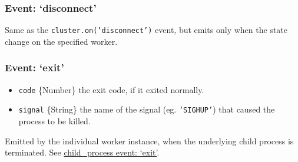 \subsubsection{Event: `disconnect'}

Same as the \texttt{cluster.on('disconnect')} event, but emits only when
the state change on the specified worker.

\begin{Shaded}
\begin{Highlighting}[]
\NormalTok{(}\NormalTok{, }\NormalTok{() \{}
\NormalTok{\};}
\end{Highlighting}
\end{Shaded}

\subsubsection{Event: `exit'}

\begin{itemize}
\item
  \texttt{code} \{Number\} the exit code, if it exited normally.
\item
  \texttt{signal} \{String\} the name of the signal (eg.
  \texttt{'SIGHUP'}) that caused the process to be killed.
\end{itemize}

Emitted by the individual worker instance, when the underlying child
process is terminated. See
\href{child\_process.html\#child\_process\_event\_exit}{child\_process
event: `exit'}.

\begin{Shaded}
\begin{Highlighting}[]
 \NormalTok{();}
\NormalTok{(}\NormalTok{, }
    \NormalTok{(}
  \NormalTok{\} }  \NormalTok{) \{}
    \NormalTok{(}
  \NormalTok{\} } \NormalTok{\{}
    \NormalTok{(}\NormalTok{);}
  \NormalTok{\}}
\NormalTok{\};}
\end{Highlighting}
\end{Shaded}

